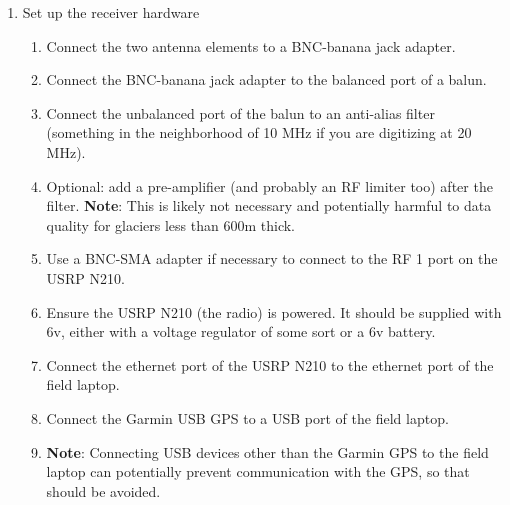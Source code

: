 \documentclass[titlepage]{article}
\begin{document}
\begin{enumerate}
    \item Set up the receiver hardware \begin{enumerate}
        \item Connect the two antenna elements to a BNC-banana jack adapter.
        \item Connect the BNC-banana jack adapter to the balanced port of a balun.
        \item Connect the unbalanced port of the balun to an anti-alias filter (something in the neighborhood of 10 MHz if you are digitizing at 20 MHz).
        \item Optional: add a pre-amplifier (and probably an RF limiter too) after the filter. \textbf{Note}: This is likely not necessary and potentially harmful to data quality for glaciers less than 600m thick.
        \item Use a BNC-SMA adapter if necessary to connect to the RF 1 port on the USRP N210.
        \item Ensure the USRP N210 (the radio) is powered. It should be supplied with 6v, either with a voltage regulator of some sort or a 6v battery.
        \item Connect the ethernet port of the USRP N210 to the ethernet port of the field laptop. 
        \item Connect the Garmin USB GPS to a USB port of the field laptop. 
        \item \textbf{Note}: Connecting USB devices other than the Garmin GPS to the field laptop can potentially prevent communication with the GPS, so that should be avoided.
    \end{enumerate}


\end{enumerate}
\end{document}
